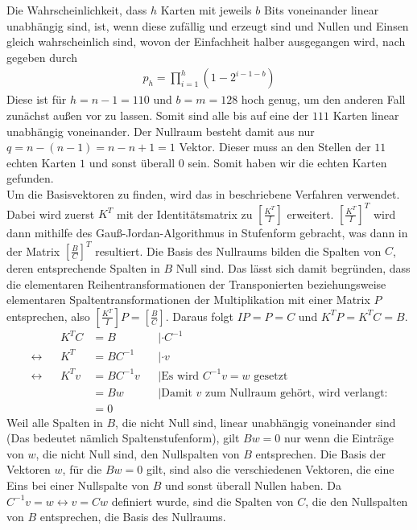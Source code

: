 \documentclass[a4paper,10pt,ngerman]{scrartcl}
\begin{document}
Die Wahrscheinlichkeit, dass $h$ Karten mit jeweils $b$ Bits voneinander linear unabhängig sind, ist, wenn diese zufällig und erzeugt sind und Nullen und Einsen gleich wahrscheinlich sind, wovon der Einfachheit halber ausgegangen wird, nach \cite{WEBSITE:1} gegeben durch
\begin{align*}
p_h = \prod^h_{i=1} (1-2^{i-1-b})
\end{align*}
Diese ist für $h=n-1=110$ und $b=m=128$ hoch genug, um den anderen Fall zunächst außen vor zu lassen. Somit sind alle bis auf eine der $111$ Karten linear unabhängig voneinander. Der Nullraum besteht damit aus nur $q=n-(n-1)=n-n+1=1$ Vektor. Dieser muss an den Stellen der $11$ echten Karten $1$ und sonst überall $0$ sein. Somit haben wir die echten Karten gefunden. \\
Um die Basisvektoren zu finden, wird das in \cite{WEBSITE:2} beschriebene Verfahren verwendet. Dabei wird zuerst $K^T$ mit der Identitätsmatrix zu $\left[\frac{K^T}{I}\right]$ erweitert. $\left[\frac{K^T}{I}\right]^T$ wird dann mithilfe des Gauß-Jordan-Algorithmus in Stufenform gebracht, was dann in der Matrix $\left[\frac{B}{C}\right]^T$ resultiert. Die Basis des Nullraums bilden die Spalten von $C$, deren entsprechende Spalten in $B$ Null sind. Das lässt sich damit begründen, dass die elementaren Reihentransformationen der Transponierten beziehungsweise elementaren Spaltentransformationen der Multiplikation mit einer Matrix $P$ entsprechen, also $\left[\frac{K^T}{I}\right] P = \left[\frac{B}{C}\right]$. Daraus folgt $I P = P = C$ und $K^T P = K^T C = B$.
\begin{align*}
&& K^T C &= B  &&|\cdot C^{-1}\\
\leftrightarrow && K^T &= BC^{-1} &&|\cdot v \\
\leftrightarrow && K^T v &= BC^{-1} v && | \text{Es wird $C^{-1}v = w$ gesetzt}\\
&& &= Bw && | \text{Damit $v$ zum Nullraum gehört, wird verlangt:}\\
&& &= 0 
\end{align*}
Weil alle Spalten in $B$, die nicht Null sind, linear unabhängig voneinander sind (Das bedeutet nämlich Spaltenstufenform), gilt $Bw=0$ nur wenn die Einträge von $w$, die nicht Null sind, den Nullspalten von $B$ entsprechen. Die Basis der Vektoren $w$, für die $Bw=0$ gilt, sind also die verschiedenen Vektoren, die eine Eins bei einer Nullspalte von $B$ und sonst überall Nullen haben. Da $C^{-1} v = w \leftrightarrow v = C w$ definiert wurde, sind die Spalten von $C$, die den Nullspalten von $B$ entsprechen, die Basis des Nullraums. \\\\
\end{document}
